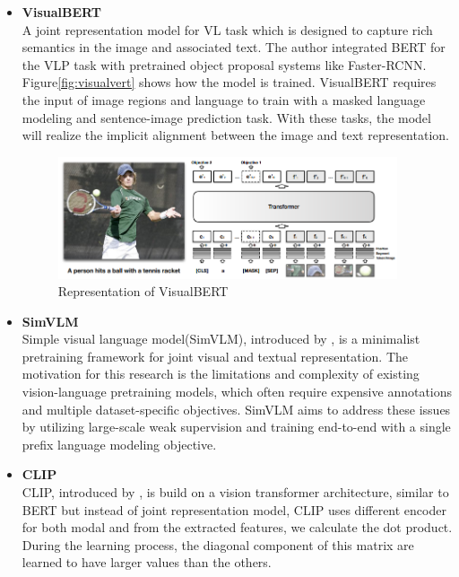 \begin{itemize}
    \item \textbf{VisualBERT}\\
    A joint representation model for VL task which is designed to capture rich semantics in the image and associated text. The author integrated BERT for the VLP task with pretrained object proposal systems like Faster-RCNN. Figure\ref{fig:visualvert} shows how the model is trained. VisualBERT requires the input of image regions and language to train with a masked language modeling and sentence-image prediction task. With these tasks, the model will realize the implicit alignment between the image and text representation.
    \begin{figure}[htbp]
        \begin{center}
            \includegraphics[width=10cm]{img/VisualBERT.png}
            \caption{Representation of VisualBERT}
        \end{center}
    \end{figure}

    \item \textbf{SimVLM}\\
    Simple visual language model(SimVLM), introduced by \cite{wang2022simvlm}, is a minimalist pretraining framework for joint visual and textual representation. The motivation for this research is the limitations and complexity of existing vision-language pretraining models, which often require expensive annotations and multiple dataset-specific objectives. SimVLM aims to address these issues by utilizing large-scale weak supervision and training end-to-end with a single prefix language modeling objective.


    \item \textbf{CLIP}\\
    CLIP, introduced by \cite{radford2021learning}, is build on a vision transformer architecture, similar to BERT but instead of joint representation model, CLIP uses different encoder for both modal and from the extracted features, we calculate the dot product. During the learning process, the diagonal component of this matrix are learned to have larger values than the others.
    
\end{itemize}


